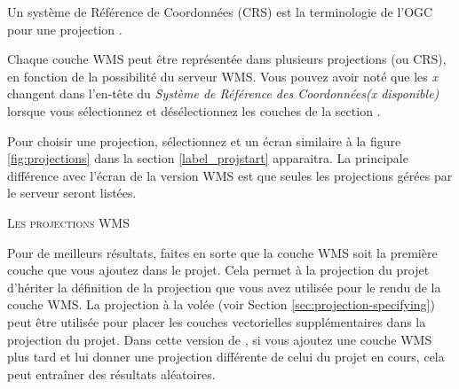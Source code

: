 
Un système de Référence de Coordonnées (CRS) est la terminologie de l'OGC pour
une projection \qg.

Chaque couche WMS peut être représentée dans plusieurs projections (ou CRS), en
fonction de la possibilité du serveur WMS. Vous pouvez avoir noté que les
\textsl{x} changent dans l'en-tête du \textsl{Système de Référence des
Coordonnées(x disponible)} lorsque vous sélectionnez et désélectionnez les
couches de la section .

Pour choisir une projection, sélectionnez  et un écran
similaire à la figure \ref{fig:projections} dans la section
\ref{label_projstart} apparaitra. La principale différence avec l'écran de la
version WMS est que seules les projections gérées par le serveur seront listées.

\begin{Tip}[ht]\caption{\textsc{Les projections WMS}}
Pour de meilleurs résultats, faites en sorte que la couche WMS soit la
première couche que vous ajoutez dans le projet. Cela permet à la projection du
projet d'hériter la définition de la projection que vous avez utilisée pour le
rendu de la couche WMS. La projection à la volée (voir Section
\ref{sec:projection-specifying}) peut être utilisée pour placer les couches
vectorielles supplémentaires dans la projection du projet. Dans cette version 
de \qg, si vous ajoutez une couche WMS plus tard et lui donner une projection
différente de celui du projet en cours, cela peut entraîner des résultats
aléatoires.
\end{Tip}

